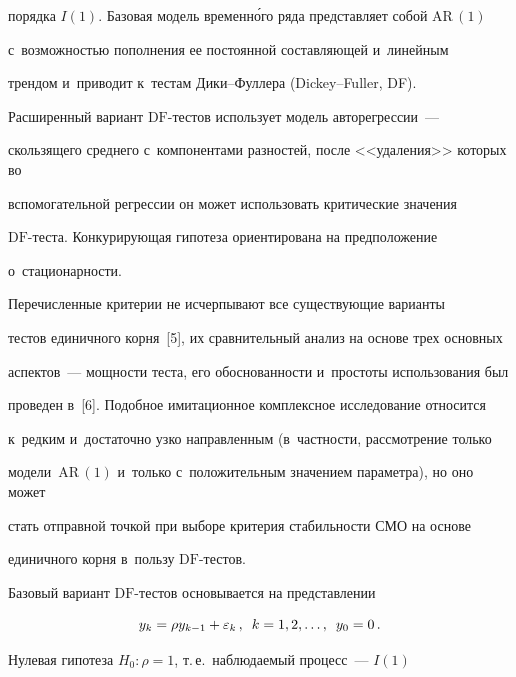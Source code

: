 порядка $I(1)$. Базовая модель временн\'{о}го ряда пред\-став\-ля\-ет собой $\mathrm{AR}\,(1)$ 


с~воз\-мож\-ностью пополнения ее постоянной составляющей и~линейным 


трендом и~приводит к~тестам Ди\-ки--Фул\-ле\-ра (Dickey--Fuller, DF). 


Расширенный вариант $\mathrm{DF}$-тес\-тов использует модель авторегрессии~--- 


скользящего среднего с~компонентами разностей, после <<удаления>> которых во 


вспомогательной регрессии он может использовать критические значения  


$\mathrm{DF}$-тес\-та. Кон\-ку\-ри\-ру\-ющая гипотеза ориентирована на предположение 


о~ста\-ци\-о\-нар\-ности.


     


     Перечисленные критерии не исчерпывают все существующие варианты 


тес\-тов единичного корня~[5], их сравнительный анализ на основе трех основных 


аспектов~--- мощ\-ности тес\-та, его обосно\-ван\-ности и~прос\-то\-ты использования был 


проведен в~[6]. Подобное имитационное комплексное исследование относится 


к~редким и~достаточно узко направленным (в~частности, рассмотрение только 


модели~$\mathrm{AR}\,(1)$ и~только с~положительным значением па\-ра\-мет\-ра), но оно может 


стать отправной точ\-кой при выборе критерия стабильности СМО на осно\-ве 


единичного корня в~пользу $\mathrm{DF}$-тес\-тов. 


     


     Базовый вариант $\mathrm{DF}$-тестов основывается на представлении


     \begin{equation}


     y_k=\rho y_{k-1}+\varepsilon_k\,,\enskip k=1,2,\ldots, \enskip y_0=0\,.


     \label{e1-kri}


     \end{equation}


Нулевая гипотеза $H_0: \rho =1$, т.\,е.\ наблюдаемый процесс~--- $I(1)$ 


